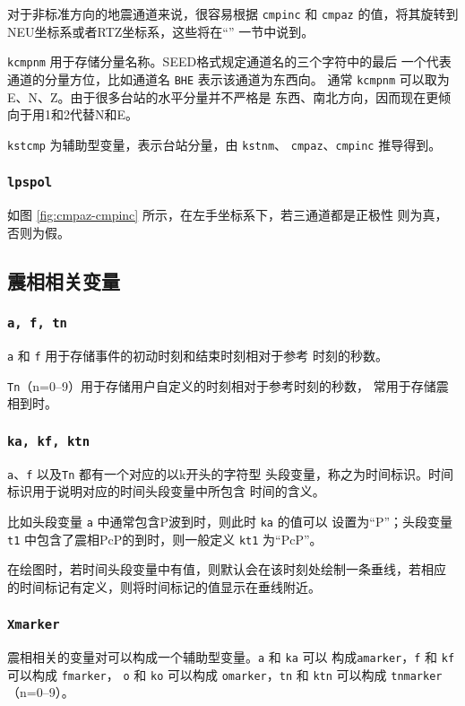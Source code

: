 对于非标准方向的地震通道来说，很容易根据 \texttt{cmpinc} 和 \texttt{cmpaz}
的值，将其旋转到NEU坐标系或者RTZ坐标系，这些将在``''
一节中说到。

\texttt{kcmpnm} 用于存储分量名称。SEED格式规定通道名的三个字符中的最后
一个代表通道的分量方位，比如通道名 \texttt{BHE} 表示该通道为东西向。
通常 \texttt{kcmpnm} 可以取为E、N、Z。由于很多台站的水平分量并不严格是
东西、南北方向，因而现在更倾向于用1和2代替N和E。

\texttt{kstcmp} 为辅助型变量，表示台站分量，由 \texttt{kstnm}、
\texttt{cmpaz}、\texttt{cmpinc} 推导得到。

\subsubsection{\texttt{lpspol}}
如图 \ref{fig:cmpaz-cmpinc} 所示，在左手坐标系下，若三通道都是正极性
则为真，否则为假。

\subsection{震相相关变量}
\subsubsection{\texttt{a, f, tn}}
\texttt{a} 和 \texttt{f} 用于存储事件的初动时刻和结束时刻相对于参考
时刻的秒数。

\texttt{Tn}（n=0--9）用于存储用户自定义的时刻相对于参考时刻的秒数，
常用于存储震相到时。

\subsubsection{\texttt{ka, kf, ktn}}
\texttt{a}、\texttt{f} 以及\texttt{Tn} 都有一个对应的以k开头的字符型
头段变量，称之为时间标识。时间标识用于说明对应的时间头段变量中所包含
时间的含义。

比如头段变量 \texttt{a} 中通常包含P波到时，则此时 \texttt{ka} 的值可以
设置为``P''；头段变量 \texttt{t1} 中包含了震相PcP的到时，则一般定义
\texttt{kt1} 为``PcP''。

在绘图时，若时间头段变量中有值，则默认会在该时刻处绘制一条垂线，若相应
的时间标记有定义，则将时间标记的值显示在垂线附近。

\subsubsection{\texttt{Xmarker}}
震相相关的变量对可以构成一个辅助型变量。\texttt{a} 和 \texttt{ka} 可以
构成\texttt{amarker}，\texttt{f} 和 \texttt{kf} 可以构成 \texttt{fmarker}，
\texttt{o} 和 \texttt{ko} 可以构成 \texttt{omarker}，\texttt{tn} 和
\texttt{ktn} 可以构成 \texttt{tnmarker}（n=0--9）。


